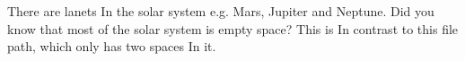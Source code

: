 There are lanets In the solar system e.g. Mars, Jupiter and Neptune.
Did you know that most of the solar system is empty space?
This is In contrast to this file path, which only has two spaces In it.
